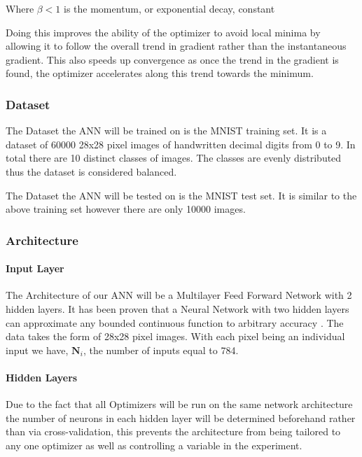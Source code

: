 \documentclass{article}
\begin{document}
 \hfill \newline
Where $\beta<1$ is the momentum, or exponential decay, constant 
 \hfill \newline
 
Doing this improves the ability of the optimizer to avoid local minima by allowing it to follow the overall trend in gradient rather than the instantaneous gradient. This also speeds up convergence as once the trend in the gradient is found, the optimizer accelerates along this trend towards the minimum.
\hfill\newpage

\subsubsection{Dataset}

The Dataset the ANN will be trained on is the MNIST training set. It is a dataset of 60000 28x28 pixel images of handwritten decimal digits  from 0 to 9. In total there are 10 distinct classes of images. The classes are evenly distributed thus the dataset is considered balanced.

The Dataset the ANN will be tested on is the MNIST test set. It is similar to the above training set however there are only 10000 images.

\subsubsection{Architecture}

\paragraph{Input Layer}
The Architecture of our ANN will be a Multilayer Feed Forward Network with 2 hidden layers.
It has been proven that a Neural Network with two hidden layers can approximate any bounded continuous function to arbitrary accuracy \cite{Hornik1989}. The data takes the form of 28x28 pixel images. With each pixel being an individual input we have, $\boldsymbol{N}_i$, the number of inputs equal to 784.

\paragraph{Hidden Layers}
 Due to the fact that all Optimizers will be run on the same network architecture the number of neurons in each hidden layer will be determined beforehand rather than via cross-validation, this prevents the architecture from being tailored to any one optimizer as well as controlling a variable in the experiment.
 
\end{document}

